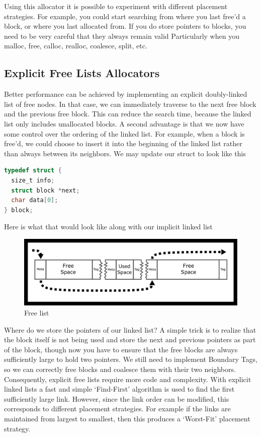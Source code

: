 Using this allocator it is possible to experiment with different placement strategies.
For example, you could start searching from where you last free'd a block, or where you last allocated from.
If you do store pointers to blocks, you need to be very careful that they always remain valid
Particularly when you malloc, free, calloc, realloc, coalesce, split, etc.

\subsection{Explicit Free Lists Allocators}

Better performance can be achieved by implementing an explicit doubly-linked list of free nodes.
In that case, we can immediately traverse to the next free block and the previous free block.
This can reduce the search time, because the linked list only includes unallocated blocks.
A second advantage is that we now have some control over the ordering of the linked list.
For example, when a block is free'd, we could choose to insert it into the beginning of the linked list rather than always between its neighbors.
We may update our struct to look like this

\begin{lstlisting}[language=C]
typedef struct {
  size_t info;
  struct block *next;
  char data[0];
} block;
\end{lstlisting}

Here is what that would look like along with our implicit linked list

\begin{figure}[H]
\centering
\includegraphics[width=.7\textwidth]{malloc/drawings/free_list.png}
\caption{Free list}
\end{figure}


Where do we store the pointers of our linked list?
A simple trick is to realize that the block itself is not being used and store the next and previous pointers as part of the block, though now you have to ensure that the free blocks are always sufficiently large to hold two pointers.
We still need to implement Boundary Tags, so we can correctly free blocks and coalesce them with their two neighbors.
Consequently, explicit free lists require more code and complexity.
With explicit linked lists a fast and simple `Find-First' algorithm is used to find the first sufficiently large link.
However, since the link order can be modified, this corresponds to different placement strategies.
For example if the links are maintained from largest to smallest, then this produces a `Worst-Fit' placement strategy.

